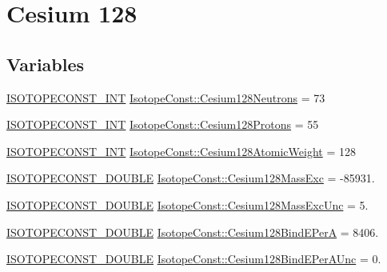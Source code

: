 \hypertarget{group___isotope_const-_cesium-_cs128}{}\section{Cesium 128}
\label{group___isotope_const-_cesium-_cs128}
\subsection*{Variables}
\begin{DoxyCompactItemize}
\item 
\mbox{\hyperlink{group___isotope_const-_macros_ga5f18360b3e99483a35c32d789e62621c}{I\+S\+O\+T\+O\+P\+E\+C\+O\+N\+S\+T\+\_\+\+I\+NT}} \mbox{\hyperlink{group___isotope_const-_cesium-_cs128_gae0616036e51f03f08e8f8c6dda33b756}{Isotope\+Const\+::\+Cesium128\+Neutrons}} = 73
\item 
\mbox{\hyperlink{group___isotope_const-_macros_ga5f18360b3e99483a35c32d789e62621c}{I\+S\+O\+T\+O\+P\+E\+C\+O\+N\+S\+T\+\_\+\+I\+NT}} \mbox{\hyperlink{group___isotope_const-_cesium-_cs128_ga0ab0139a257bd94497ed5d7f41b2ff56}{Isotope\+Const\+::\+Cesium128\+Protons}} = 55
\item 
\mbox{\hyperlink{group___isotope_const-_macros_ga5f18360b3e99483a35c32d789e62621c}{I\+S\+O\+T\+O\+P\+E\+C\+O\+N\+S\+T\+\_\+\+I\+NT}} \mbox{\hyperlink{group___isotope_const-_cesium-_cs128_ga55d376d4e5286ee782339b2e626b74a1}{Isotope\+Const\+::\+Cesium128\+Atomic\+Weight}} = 128
\item 
\mbox{\hyperlink{group___isotope_const-_macros_ga8f45a7272ce02c0b4c65c44636ed719a}{I\+S\+O\+T\+O\+P\+E\+C\+O\+N\+S\+T\+\_\+\+D\+O\+U\+B\+LE}} \mbox{\hyperlink{group___isotope_const-_cesium-_cs128_ga071bbfb8a9b33d02cd49e7a3ace6c4b7}{Isotope\+Const\+::\+Cesium128\+Mass\+Exc}} = -\/85931.
\item 
\mbox{\hyperlink{group___isotope_const-_macros_ga8f45a7272ce02c0b4c65c44636ed719a}{I\+S\+O\+T\+O\+P\+E\+C\+O\+N\+S\+T\+\_\+\+D\+O\+U\+B\+LE}} \mbox{\hyperlink{group___isotope_const-_cesium-_cs128_ga7b8ce959e998f0e368ba77e78680eef1}{Isotope\+Const\+::\+Cesium128\+Mass\+Exc\+Unc}} = 5.
\item 
\mbox{\hyperlink{group___isotope_const-_macros_ga8f45a7272ce02c0b4c65c44636ed719a}{I\+S\+O\+T\+O\+P\+E\+C\+O\+N\+S\+T\+\_\+\+D\+O\+U\+B\+LE}} \mbox{\hyperlink{group___isotope_const-_cesium-_cs128_gabd787ada9d1c5a1735d21d75629e7a31}{Isotope\+Const\+::\+Cesium128\+Bind\+E\+PerA}} = 8406.
\item 
\mbox{\hyperlink{group___isotope_const-_macros_ga8f45a7272ce02c0b4c65c44636ed719a}{I\+S\+O\+T\+O\+P\+E\+C\+O\+N\+S\+T\+\_\+\+D\+O\+U\+B\+LE}} \mbox{\hyperlink{group___isotope_const-_cesium-_cs128_gadbe6fb23dfe460bbf30d5bd1f2c464df}{Isotope\+Const\+::\+Cesium128\+Bind\+E\+Per\+A\+Unc}} = 0.

\end{DoxyCompactItemize}
